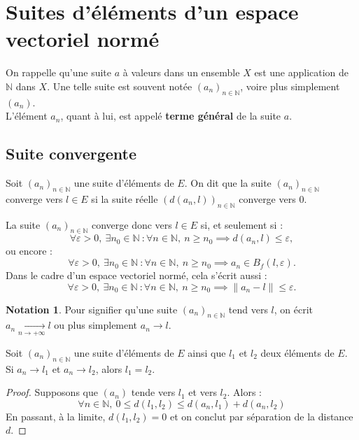 \documentclass[french]{article}
\newcommand{\N}{\mathbb{N}}
\theoremstyle{plain}
\theoremstyle{definition}
\newtheorem*{notation}{Notation}
\theoremstyle{remark}
\begin{document}
\section{Suites d'éléments d'un espace vectoriel normé}

On rappelle qu'une suite $a$ à valeurs dans un ensemble $X$ est une application de $\N$ dans $X$. Une telle suite est souvent notée $(a_n)_{n\in\N}$, voire plus simplement $(a_n)$. \\
L'élément $a_n$, quant à lui, est appelé \textbf{terme général} de la suite $a$.

\subsection{Suite convergente}

\begin{dfn}
	Soit $(a_n)_{n\in\N}$ une suite d'éléments de $E$. On dit que la suite $(a_n)_{n\in\N}$ converge vers $l\in E$ si la suite réelle $(d(a_n,l))_{n\in\N}$ converge vers $0$.
\end{dfn}

La suite $(a_n)_{n\in\N}$ converge donc vers $l\in E$ si, et seulement si : $$\forall\varepsilon>0,\ \exists n_0\in\N\ : \forall n\in\N,\ n\geqslant n_0\implies d(a_n,l)\leqslant\varepsilon,$$
ou encore :
$$\forall\varepsilon>0,\ \exists n_0\in\N\ : \forall n\in\N,\ n\geqslant n_0\implies a_n\in B_f(l,\varepsilon).$$
Dans le cadre d'un espace vectoriel normé, cela s'écrit aussi : $$\forall\varepsilon>0,\ \exists n_0\in\N\ : \forall n\in\N,\ n\geqslant n_0\implies \lVert a_n-l\rVert\leqslant\varepsilon.$$

\begin{notation}
	Pour signifier qu'une suite $(a_n)_{n\in\N}$ tend vers $l$, on écrit $a_n\xrightarrow[n\to+\infty]{}l$ ou plus simplement $a_n\to l$.
\end{notation}

\begin{prop}%
	Soit $(a_n)_{n\in\N}$ une suite d'éléments de $E$ ainsi que $l_1$ et $l_2$ deux éléments de $E$. Si $a_n\to l_1$ et $a_n\to l_2$, alors $l_1=l_2$.
\end{prop}
\begin{proof}
	Supposons que $(a_n)$ tende vers $l_1$ et vers $l_2$. Alors : $$\forall n\in\N,\ 0\leqslant d(l_1,l_2)\leqslant d(a_n,l_1)+d(a_n,l_2)$$ En passant, à la limite, $d(l_1,l_2)=0$ et on conclut par séparation de la distance $d$.
\end{proof}
\end{document}
